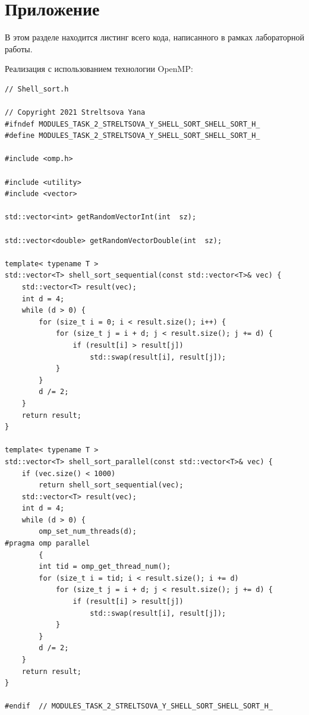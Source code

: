 \documentclass{report}
\begin{document}
\section*{Приложение}
В этом разделе находится листинг всего кода, написанного в рамках лабораторной работы.
\par Реализация с использованием технологии OpenMP:
\begin{lstlisting}
// Shell_sort.h

// Copyright 2021 Streltsova Yana
#ifndef MODULES_TASK_2_STRELTSOVA_Y_SHELL_SORT_SHELL_SORT_H_
#define MODULES_TASK_2_STRELTSOVA_Y_SHELL_SORT_SHELL_SORT_H_

#include <omp.h>

#include <utility>
#include <vector>

std::vector<int> getRandomVectorInt(int  sz);

std::vector<double> getRandomVectorDouble(int  sz);

template< typename T >
std::vector<T> shell_sort_sequential(const std::vector<T>& vec) {
    std::vector<T> result(vec);
    int d = 4;
    while (d > 0) {
        for (size_t i = 0; i < result.size(); i++) {
            for (size_t j = i + d; j < result.size(); j += d) {
                if (result[i] > result[j])
                    std::swap(result[i], result[j]);
            }
        }
        d /= 2;
    }
    return result;
}

template< typename T >
std::vector<T> shell_sort_parallel(const std::vector<T>& vec) {
    if (vec.size() < 1000)
        return shell_sort_sequential(vec);
    std::vector<T> result(vec);
    int d = 4;
    while (d > 0) {
        omp_set_num_threads(d);
#pragma omp parallel
        {
        int tid = omp_get_thread_num();
        for (size_t i = tid; i < result.size(); i += d)
            for (size_t j = i + d; j < result.size(); j += d) {
                if (result[i] > result[j])
                    std::swap(result[i], result[j]);
            }
        }
        d /= 2;
    }
    return result;
}

#endif  // MODULES_TASK_2_STRELTSOVA_Y_SHELL_SORT_SHELL_SORT_H_


\end{lstlisting}
\end{document}
